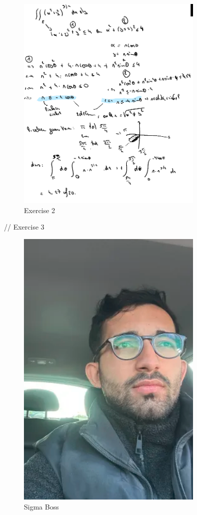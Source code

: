 \documentclass[a4paper]{report}
\begin{document}
\begin{figure}[H]
	\centering
	\includegraphics[width=0.8\textwidth]{assets/bord_5_ex_2.png}
	\caption{Exercise 2}
	\label{fig:bord_5_ex_2}
\end{figure}

// Exercise 3



\begin{figure}[h]
	\centering
	\includegraphics[width=0.8\textwidth]{assets/ilkay.png}
	\caption{Sigma Boss}
	\label{fig:ilkay}
\end{figure}
\end{document}
